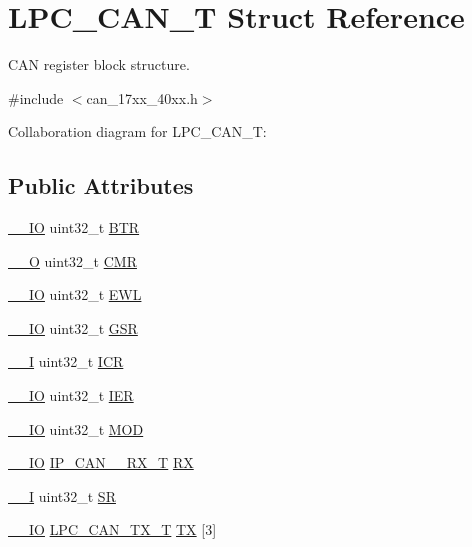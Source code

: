 \hypertarget{structLPC__CAN__T}{}\section{L\+P\+C\+\_\+\+C\+A\+N\+\_\+T Struct Reference}
\label{structLPC__CAN__T}


C\+AN register block structure.  




{\ttfamily \#include $<$can\+\_\+17xx\+\_\+40xx.\+h$>$}



Collaboration diagram for L\+P\+C\+\_\+\+C\+A\+N\+\_\+T\+:
\subsection*{Public Attributes}
\begin{DoxyCompactItemize}
\item 
\hyperlink{core__cm3_8h_aec43007d9998a0a0e01faede4133d6be}{\+\_\+\+\_\+\+IO} uint32\+\_\+t \hyperlink{structLPC__CAN__T_a2ef6231da82a2f3f55f05797f8ac4fa0}{B\+TR}
\item 
\hyperlink{core__cm3_8h_a7e25d9380f9ef903923964322e71f2f6}{\+\_\+\+\_\+O} uint32\+\_\+t \hyperlink{structLPC__CAN__T_a2b22d55ceb4c934524714384f23cc87e}{C\+MR}
\item 
\hyperlink{core__cm3_8h_aec43007d9998a0a0e01faede4133d6be}{\+\_\+\+\_\+\+IO} uint32\+\_\+t \hyperlink{structLPC__CAN__T_ab79cd2d466c6f59c3bb43873fd556af6}{E\+WL}
\item 
\hyperlink{core__cm3_8h_aec43007d9998a0a0e01faede4133d6be}{\+\_\+\+\_\+\+IO} uint32\+\_\+t \hyperlink{structLPC__CAN__T_ae36d4c72254feab1bce53a7653612acc}{G\+SR}
\item 
\hyperlink{core__cm3_8h_af63697ed9952cc71e1225efe205f6cd3}{\+\_\+\+\_\+I} uint32\+\_\+t \hyperlink{structLPC__CAN__T_a8ccbac222a59bb6da7ba81f8394dbb2e}{I\+CR}
\item 
\hyperlink{core__cm3_8h_aec43007d9998a0a0e01faede4133d6be}{\+\_\+\+\_\+\+IO} uint32\+\_\+t \hyperlink{structLPC__CAN__T_a2ab9628e17449ba6a3bfa9c8479c2e8a}{I\+ER}
\item 
\hyperlink{core__cm3_8h_aec43007d9998a0a0e01faede4133d6be}{\+\_\+\+\_\+\+IO} uint32\+\_\+t \hyperlink{structLPC__CAN__T_a8bc39ce9227ace84de55a902d60cb11e}{M\+OD}
\item 
\hyperlink{core__cm3_8h_aec43007d9998a0a0e01faede4133d6be}{\+\_\+\+\_\+\+IO} \hyperlink{structIP__CAN__001__RX__T}{I\+P\+\_\+\+C\+A\+N\+\_\+\_\+\+R\+X\+\_\+T} \hyperlink{structLPC__CAN__T_a9890a3ed561ea1e0fbce9a2d6321ac39}{RX}
\item 
\hyperlink{core__cm3_8h_af63697ed9952cc71e1225efe205f6cd3}{\+\_\+\+\_\+I} uint32\+\_\+t \hyperlink{structLPC__CAN__T_a16d0fa727f1fbcff03739b512b00806d}{SR}
\item 
\hyperlink{core__cm3_8h_aec43007d9998a0a0e01faede4133d6be}{\+\_\+\+\_\+\+IO} \hyperlink{structLPC__CAN__TX__T}{L\+P\+C\+\_\+\+C\+A\+N\+\_\+\+T\+X\+\_\+T} \hyperlink{structLPC__CAN__T_ad24f43de6447283b4379922cc1c83a1d}{TX} \mbox{[}3\mbox{]}
\end{DoxyCompactItemize}


